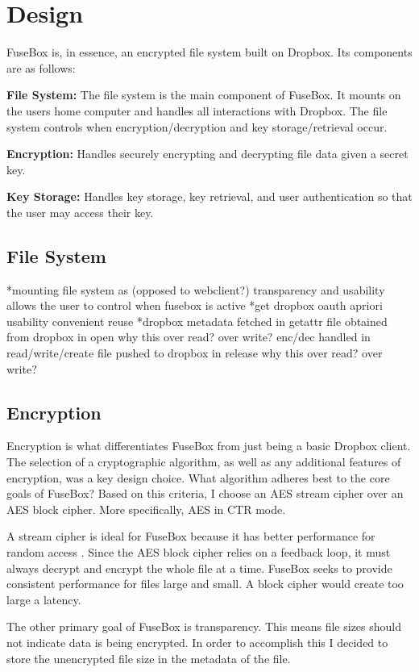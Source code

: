 \documentclass[11pt,twocolumn,letterpaper]{article}
\newcommand{\appname}{FuseBox }
\newcommand{\appnameWOspace}{FuseBox}
\begin{document}
\section{Design}
\label{sec:design}
\appname is, in essence, an encrypted file system built on
Dropbox. Its components are as follows:
\par {\bf File System:} The file system is the main component of 
\appnameWOspace. It mounts on the users home computer and handles 
all interactions with Dropbox. The file system controls when
encryption/decryption and key storage/retrieval occur.   
\par {\bf Encryption:} Handles securely encrypting and decrypting file data
given a secret key. 
\par {\bf Key Storage:} Handles key storage, key retrieval, and user
authentication so that the user may access their key. 

\subsection{File System}
\label{sec:fs}
*mounting file system as (opposed to webclient?)
   transparency and usability
   allows the user to control when fusebox is active
*get dropbox oauth apriori
   usability
   convenient reuse
*dropbox metadata
   fetched in getattr
   file obtained from dropbox in open
       why this over read? over write?
   enc/dec handled in read/write/create
   file pushed to dropbox in release
       why this over read? over write?


\subsection{Encryption}
\label{sec:enc}
Encryption is what differentiates \appname from just being a basic
Dropbox client. The selection of a cryptographic algorithm, as well as
any additional features of encryption, was a key design choice. What
algorithm adheres best to the core goals of \appnameWOspace? Based on
this criteria, I choose an AES stream cipher over an AES block
cipher. More specifically, AES in CTR mode.  
\par A stream cipher is ideal for \appname because it has better
performance for random access \cite{exampleref1}. Since the AES block 
cipher relies on a feedback loop, it must always decrypt and encrypt
the whole file at a time. \appname seeks to provide consistent
performance for files large and small. A block cipher would create
too large a latency.   
\par The other primary goal of \appname is transparency. This means
file sizes should not indicate data is being encrypted. In order to
accomplish this I decided to store the unencrypted file size in the
metadata of the file. 
\end{document}
